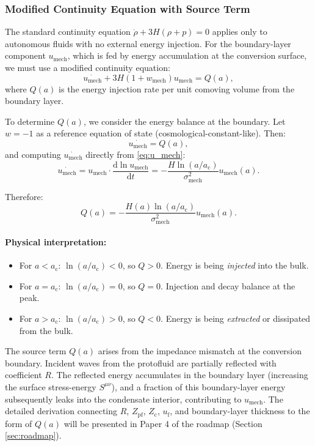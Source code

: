 \documentclass[11pt,a4paper]{article}
\newcommand{\dx}{\mathrm{d}}
\newcommand{\ac}{a_{\mathrm{c}}}
\newcommand{\sigmamech}{\sigma_{\mathrm{mech}}}
\newcommand{\umech}{u_{\mathrm{mech}}}
\newcommand{\Zpf}{Z_{\mathrm{pf}}}
\newcommand{\Zcond}{Z_{\mathrm{c}}}
\newcommand{\uf}{u_{\mathrm{f}}}
\theoremstyle{definition}
\begin{document}
\subsubsection{Modified Continuity Equation with Source Term}
\label{sec:source_term}

The standard continuity equation $\dot{\rho} + 3H(\rho + p) = 0$ applies only to autonomous fluids with no external energy injection. For the boundary-layer component $\umech$, which is fed by energy accumulation at the conversion surface, we must use a modified continuity equation:
\begin{equation}
\label{eq:modified_continuity}
\dot{\umech} + 3H(1 + w_{\mathrm{mech}})\umech = Q(a),
\end{equation}
where $Q(a)$ is the energy injection rate per unit comoving volume from the boundary layer.

To determine $Q(a)$, we consider the energy balance at the boundary. Let $w = -1$ as a reference equation of state (cosmological-constant-like). Then:
\begin{equation}
\dot{\umech} = Q(a),
\end{equation}
and computing $\dot{\umech}$ directly from \eqref{eq:u_mech}:
\begin{equation}
\dot{\umech} = \umech \cdot \frac{\dx \ln \umech}{\dx t} = -\frac{H\ln(a/\ac)}{\sigmamech^2} \umech(a).
\end{equation}

Therefore:
\begin{equation}
\label{eq:Q_result}
\boxed{Q(a) = -\frac{H(a)\ln(a/\ac)}{\sigmamech^2} \umech(a).}
\end{equation}

\paragraph{Physical interpretation:}
\begin{itemize}[leftmargin=1.8em]
  \item For $a < \ac$: $\ln(a/\ac) < 0$, so $Q > 0$. Energy is being \emph{injected} into the bulk.
  \item For $a = \ac$: $\ln(a/\ac) = 0$, so $Q = 0$. Injection and decay balance at the peak.
  \item For $a > \ac$: $\ln(a/\ac) > 0$, so $Q < 0$. Energy is being \emph{extracted} or dissipated from the bulk.
\end{itemize}

The source term $Q(a)$ arises from the impedance mismatch at the conversion boundary. Incident waves from the protofluid are partially reflected with coefficient $R$. The reflected energy accumulates in the boundary layer (increasing the surface stress-energy $S^{\mu\nu}$), and a fraction of this boundary-layer energy subsequently leaks into the condensate interior, contributing to $\umech$. The detailed derivation connecting $R$, $\Zpf$, $\Zcond$, $\uf$, and boundary-layer thickness to the form of $Q(a)$ will be presented in Paper 4 of the roadmap (Section \ref{sec:roadmap}).
\end{document}
